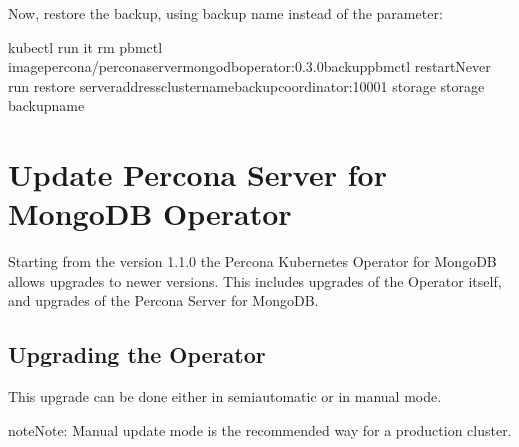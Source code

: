 \documentclass[letterpaper,10pt,english]{sphinxmanual}
\begin{document}
\begin{enumerate}
Now, restore the backup, using backup name instead of the
 parameter:

\begin{sphinxVerbatim}[commandchars=\\\{\}]
kubectl run \PYGZhy{}it \PYGZhy{}\PYGZhy{}rm pbmctl \PYGZhy{}\PYGZhy{}imagepercona/percona\PYGZhy{}server\PYGZhy{}mongodb\PYGZhy{}operator:0.3.0\PYGZhy{}backup\PYGZhy{}pbmctl \PYGZhy{}\PYGZhy{}restartNever \PYGZhy{}\PYGZhy{} 
  run restore 
  \PYGZhy{}\PYGZhy{}server\PYGZhy{}address\PYGZlt{}cluster\PYGZhy{}name\PYGZgt{}\PYGZhy{}backup\PYGZhy{}coordinator:10001 
  \PYGZhy{}\PYGZhy{}storage \PYGZlt{}storage\PYGZgt{} 
  backup\PYGZhy{}name
\end{sphinxVerbatim}

\end{enumerate}


\chapter{Update Percona Server for MongoDB Operator}
\label{\detokenize{update:update-percona-server-for-mongodb-operator}}\label{\detokenize{update:operator-updates}}\label{\detokenize{update::doc}}
Starting from the version 1.1.0 the Percona Kubernetes Operator for MongoDB allows
upgrades to newer versions. This includes upgrades of the
Operator itself, and upgrades of the Percona Server for MongoDB.


\section{Upgrading the Operator}
\label{\detokenize{update:upgrading-the-operator}}\label{\detokenize{update:operator-update}}
This upgrade can be done either in semi\sphinxhyphen{}automatic or in manual mode.

\begin{sphinxadmonition}{note}{Note:}
Manual update mode is the recommended way for a production cluster.
\end{sphinxadmonition}
\end{document}
